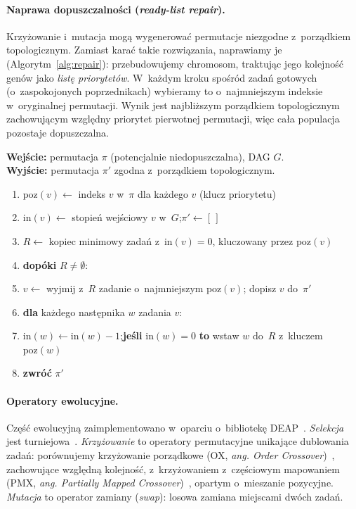 \documentclass[pdflatex,sn-mathphys,Numbered]{sn-jnl}
\newenvironment{pseudo}
  {\begin{enumerate}[leftmargin=2.6em, itemsep=1pt, topsep=2pt,
     label=\scriptsize\sffamily\arabic*]\small}
  {\end{enumerate}}
\newcommand{\Kw}[1]{\textbf{#1}}%
\newcommand{\In}[1]{\textbf{Wejście:} #1}
\newcommand{\Out}[1]{\textbf{Wyjście:} #1}
\newcommand{\ind}{\hspace*{1.5em}}%
\begin{document}
\paragraph{Naprawa dopuszczalności (\textit{ready-list repair}).}
Krzyżowanie i~mutacja mogą wygenerować permutacje niezgodne z~porządkiem
topologicznym. Zamiast karać takie rozwiązania, naprawiamy je
(Algorytm~\ref{alg:repair}): przebudowujemy chromosom, traktując jego kolejność
genów jako \emph{listę priorytetów}. W~każdym kroku spośród zadań gotowych
(o~zaspokojonych poprzednikach) wybieramy to o~najmniejszym indeksie w~oryginalnej
permutacji. Wynik jest najbliższym porządkiem topologicznym zachowującym względny
priorytet pierwotnej permutacji, więc cała populacja pozostaje dopuszczalna.

\begin{algorithm}[H]
\caption{Naprawa ready-list (przebudowa permutacji do porządku topologicznego)}
\label{alg:repair}
\In{permutacja $\pi$ (potencjalnie niedopuszczalna), DAG $G$.}\\
\Out{permutacja $\pi'$ zgodna z~porządkiem topologicznym.}
\begin{pseudo}
\item $\mathrm{poz}(v) \gets$ indeks $v$ w~$\pi$ dla każdego $v$ \quad(klucz priorytetu)
\item $\mathrm{in}(v) \gets$ stopień wejściowy $v$ w~$G$;\quad $\pi' \gets [\,]$
\item $R \gets$ kopiec minimowy zadań z~$\mathrm{in}(v)=0$, kluczowany przez $\mathrm{poz}(v)$
\item \Kw{dopóki} $R \neq \emptyset$:
\item \ind $v \gets$ wyjmij z~$R$ zadanie o~najmniejszym $\mathrm{poz}(v)$; dopisz $v$ do~$\pi'$
\item \ind \Kw{dla} każdego następnika $w$ zadania $v$:
\item \ind\ind $\mathrm{in}(w) \gets \mathrm{in}(w)-1$;\quad \Kw{jeśli} $\mathrm{in}(w)=0$ \Kw{to} wstaw $w$ do~$R$ z~kluczem $\mathrm{poz}(w)$
\item \Kw{zwróć} $\pi'$
\end{pseudo}
\end{algorithm}

\paragraph{Operatory ewolucyjne.}
Część ewolucyjną zaimplementowano w~oparciu o~bibliotekę DEAP~\cite{deap2012}.
\emph{Selekcja} jest turniejowa~\cite{miller1995}. \emph{Krzyżowanie} to operatory
permutacyjne unikające dublowania zadań: porównujemy krzyżowanie porządkowe (OX,
\textit{ang. Order Crossover})~\cite{davis1985}, zachowujące względną kolejność,
z~krzyżowaniem z~częściowym mapowaniem (PMX, \textit{ang. Partially Mapped
Crossover})~\cite{goldberg1985}, opartym o~mieszanie pozycyjne. \emph{Mutacja} to
operator zamiany (\textit{swap}): losowa zamiana miejscami dwóch zadań.
\end{document}
